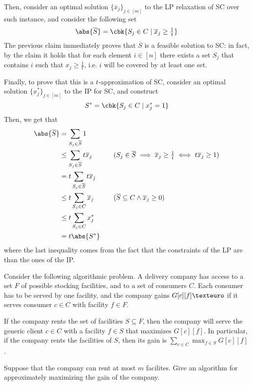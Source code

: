 \documentclass[a4paper, 12pt]{report}
\begin{document}
{        Then, consider an optimal solution $\{\overline x_j\}_{j \in [m]}$ to the LP relaxation of SC over such instance, and consider the following set $$\abs{\overline S} = \cbk{S_j \in C \mid \overline x_j \ge \tfrac{1}{t}}$$ The previous claim immediately proves that $\overline S$ is a feasible solution to SC: in fact, by the claim it holds that for each element $i \in [n]$ there exists a set $S_j$ that contains $i$ such that $x_j \ge \tfrac{1}{t}$, i.e. $i$ will be covered by at least one set.

        Finally, to prove that this is a $t$-approximation of SC, consider an optimal solution $\{x^*_j\}_{j \in [m]}$ to the IP for SC, and construct $$S^* = \cbk{S_j \in C \mid x_j^* = 1}$$ Then, we get that
        \begin{equation*}
            \begin{alignedat}{2}
                \abs{\overline S} &= \sum_{S_j \in \overline S}{1} && \\
                                  &\le \sum_{S_j \in \overline S}{t \overline x_j} && \quad \quad (S_j \in \overline S \implies \overline x_j \ge \tfrac{1}{t} \iff t \overline x_j \ge 1) \\
                                  &= t \sum_{S_j \in \overline S}{t \overline x_j} && \\
                                  &\le t \sum_{S_j \in C}{\overline x_j} && \quad \quad (\overline S \subseteq C \land \overline x_j \ge 0) \\
                                  &\le t \sum_{S_j \in C}{x^*_j} \\
                                  &= t \abs{S^*}
            \end{alignedat}
        \end{equation*}
        where the last inequality comes from the fact that the constraints of the LP are  than the ones of the IP.
    }

    \begin{framedprob}{}
        Consider the following algorithmic problem. A delivery company has access to a set $F$ of possible stocking facilities, and to a set of consumers $C$. Each consumer has to be served by one facility, and the company gains $G[c][f] \texteuro$ if it serves consumer $c \in C$ with facility $f \in F$.

        If the company rents the set of facilities $S \subseteq F$, then the company will serve the generic client $c \in C$ with a facility $f \in S$ that maximizes $G[c][f]$. In particular, if the company rents the facilities of $S$, then its gain is $\sum_{c \in C}{\max_{f \in S}{G[c][f]}}$.

        Suppose that the company can rent at most $m$ facilites. Give an algorithm for approximately maximizing the gain of the company.
    \end{framedprob}
\end{document}
